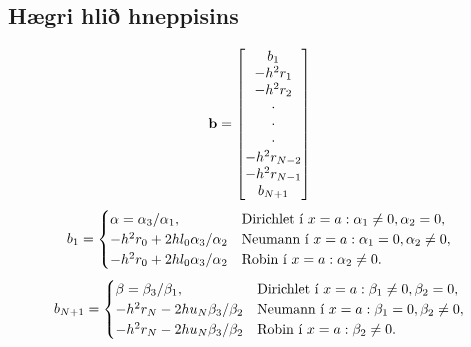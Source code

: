 \documentclass[letterpaper,10pt,icelandic]{sphinxmanual}
\begin{document}
\subsection{Hægri hlið hneppisins}
\label{kafli07:haegri-hli-hneppisins}\begin{gather}
\begin{split}{\mbox{${\bf b}$}}=\left[
\begin{matrix}
b_1 \\ -h^2r_1\\ -h^2r_2\\ \cdot \\ \cdot\\ \cdot\\
-h^2r_{N-2}\\ -h^2r_{N-1}\\ b_{N+1}
\end{matrix}\right]\end{split}\notag
\end{gather}\begin{gather}
\begin{split}b_{1}=
\begin{cases}
  \alpha=\alpha_3/\alpha_1,
&\text{Dirichlet í } x=a: \alpha_1\neq 0, \alpha_2=0,\\
-h^2r_0+2hl_0\alpha_3/\alpha_2
&\text{Neumann í } x=a:  \alpha_1=0, \alpha_2\neq 0,\\
-h^2r_0+2hl_0\alpha_3/\alpha_2&\text{Robin í } x=a:  \alpha_2\neq 0.
\end{cases}\end{split}\notag
\end{gather}\begin{gather}
\begin{split}b_{N+1}=
\begin{cases}
  \beta=\beta_3/\beta_1,
&\text{Dirichlet í } x=a: \beta_1\neq 0, \beta_2=0,\\
-h^2r_N-2hu_N\beta_3/\beta_2&\text{Neumann í } x=a:  \beta_1=0, \beta_2\neq 0,\\
-h^2r_N-2hu_N\beta_3/\beta_2&\text{Robin í } x=a:  \beta_2\neq 0.
\end{cases}\end{split}\notag
\end{gather}
\end{document}
